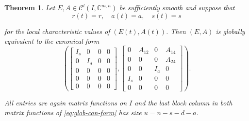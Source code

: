\documentclass[]{book}
\newtheorem{theorem}{Theorem}[chapter]
\theoremstyle{definition}
\theoremstyle{definition}
\theoremstyle{definition}
\theoremstyle{definition}
\theoremstyle{remark}
\begin{document}
\begin{theorem}
\protect\hypertarget{thm:global-canonical-form}{}{\label{thm:global-canonical-form} }
Let \(E, A \in \mathcal C^l(I, \mathbb C^{m,n})\) be sufficiently smooth and suppose that
\begin{equation}
    r(t) = r, \quad a(t)=a, \quad s(t)=s \label{eq:glob-local-char-vals}
\end{equation}

for the local characteristic values of \((E(t), A(t))\). Then \((E, A)\) is globally equivalent to the canonical form
\begin{equation}
\left(
\begin{bmatrix}
I_s &  0  & 0 & 0 \\
0   & I_d & 0 & 0 \\
0   &  0  & 0 & 0 \\
0   &  0  & 0 & 0 \\
0   &  0  & 0 & 0
\end{bmatrix}, 
\begin{bmatrix}
0   & A_{12}&  0  & A_{14} \\
0   &   0   &  0  & A_{24} \\
0   &   0   & I_a & 0 \\
I_s &   0   &  0  & 0 \\
0   &   0   &  0  & 0
\end{bmatrix}
\right ).
\label{eq:glob-can-form}
\end{equation}

All entries are again matrix functions on \(I\) and the last block column in both matrix functions of \eqref{eq:glob-can-form} has size \(u=n-s-d-a\).
\end{theorem}
\end{document}
